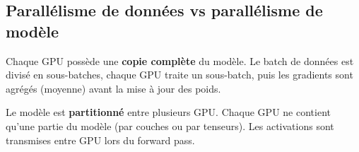 \subsection{Parall\'elisme de donn\'ees vs parall\'elisme de mod\`ele}

\begin{definition}
Chaque GPU poss\`ede une \textbf{copie compl\`ete} du mod\`ele. Le batch
de donn\'ees est divis\'e en sous-batches, chaque GPU traite un sous-batch,
puis les gradients sont agr\'eg\'es (moyenne) avant la mise \`a jour des
poids.
\end{definition}

\begin{definition}
Le mod\`ele est \textbf{partitionn\'e} entre plusieurs GPU. Chaque GPU
ne contient qu'une partie du mod\`ele (par couches ou par tenseurs). Les
activations sont transmises entre GPU lors du forward pass.
\end{definition}

